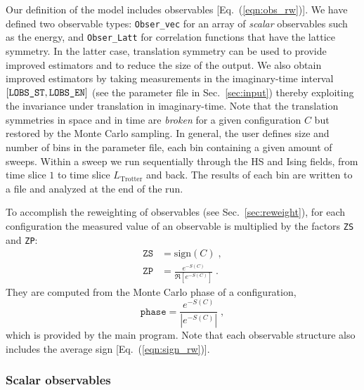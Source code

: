 Our definition  of the model includes observables [Eq.~(\ref{eqn:obs_rw})]. We have defined two observable types: \texttt{Obser\_vec}  for an array of \emph{scalar} observables
such as the energy, and  \texttt{Obser\_Latt}   for correlation functions that have the lattice symmetry. In the latter case, translation symmetry can be used to provide improved estimators and to reduce the size of the output.   
We also obtain improved estimators by taking measurements in the imaginary-time interval $[\texttt{LOBS\_ST},\texttt{LOBS\_EN\texttt{}}]$ (see the parameter file in Sec.~\ref{sec:input}) thereby exploiting the invariance under translation in imaginary-time.
Note that the translation symmetries  in space and in time are \emph{broken} for a given  configuration $C$ but restored by the Monte Carlo sampling. 
In general, the user defines size and number of bins in the parameter file, each bin containing a given amount of sweeps. Within a sweep we run sequentially through the HS and Ising fields, from time slice $1$ to time slice $L_{\text{Trotter}}$ and back.  The results of each bin are written to a file  and analyzed at the end of the run.     

To accomplish the reweighting of observables (see Sec.~\ref{sec:reweight}), for each configuration the measured value of an observable is multiplied by the factors \texttt{ZS} and \texttt{ZP}:
\begin{align}
\texttt{ZS} &= \text{sign}(C)\;, \\
\texttt{ZP} &= \frac{e^{-S(C)}} {\Re \left[e^{-S(C)} \right]}\;.
\end{align}
They are computed from the Monte Carlo phase of a configuration,
\begin{equation}\label{eqn:phase}
	\texttt{phase}   =   \frac{e^{-S(C)}}{ \left| e^{-S(C) }\right| }\;,
\end{equation}
which is provided by the main program.
Note that each observable structure also includes the average sign [Eq.~(\ref{eqn:sign_rw})].

\subsubsection{Scalar observables}


